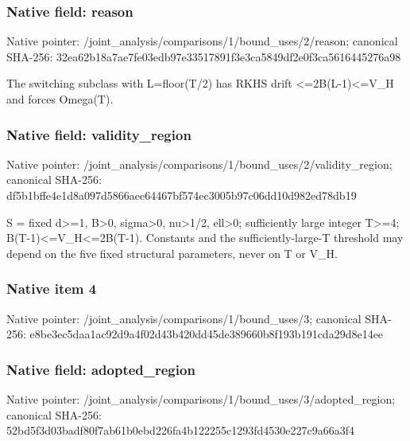 \documentclass[10pt,a4paper]{article}
\begin{document}
\subsubsection{Native field: reason}
Native pointer: /joint\_\allowbreak{}analysis/comparisons/1/bound\_\allowbreak{}uses/2/reason; canonical SHA-256: 32ea62b18a7ae7fe03edb97e33517891f3e3ca5849df2e0f3ca5616445276a98

\begingroup\raggedright\sloppy The switching subclass with L=\allowbreak{}floor(T/\allowbreak{}2) has RKHS drift <=\allowbreak{}2B(L-1)<=\allowbreak{}V\_\allowbreak{}H and forces Omega(T).\par\endgroup

\subsubsection{Native field: validity\_\allowbreak{}region}
Native pointer: /joint\_\allowbreak{}analysis/comparisons/1/bound\_\allowbreak{}uses/2/validity\_\allowbreak{}region; canonical SHA-256: df5b1bffe4e1d8a097d5866aee64467bf574ec3005b97c06dd10d982ed78db19

\begingroup\raggedright\sloppy S =\allowbreak{} fixed d>=\allowbreak{}1,\allowbreak{} B>0,\allowbreak{} sigma>0,\allowbreak{} nu>1/\allowbreak{}2,\allowbreak{} ell>0;\allowbreak{} sufficiently large integer T>=\allowbreak{}4;\allowbreak{} B(T-1)<=\allowbreak{}V\_\allowbreak{}H<=\allowbreak{}2B(T-1). Constants and the sufficiently-large-T threshold may depend on the five fixed structural parameters,\allowbreak{} never on T or V\_\allowbreak{}H.\par\endgroup

\subsubsection{Native item 4}
Native pointer: /joint\_\allowbreak{}analysis/comparisons/1/bound\_\allowbreak{}uses/3; canonical SHA-256: e8be3ec5daa1ac92d9a4f02d43b420dd45de389660b8f193b191cda29d8e14ee

\subsubsection{Native field: adopted\_\allowbreak{}region}
Native pointer: /joint\_\allowbreak{}analysis/comparisons/1/bound\_\allowbreak{}uses/3/adopted\_\allowbreak{}region; canonical SHA-256: 52bd5f3d03badf80f7ab61b0ebd226fa4b122255c1293fd4530e227c9a66a3f4
\end{document}
